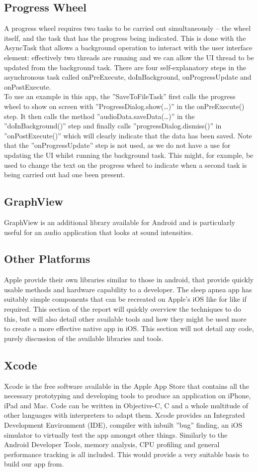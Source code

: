 \subsection{Progress Wheel}
A progress wheel requires two tasks to be carried out simultaneously – the wheel itself, and the task that has the progress being indicated. This is done with the AsyncTask that allows a background operation to interact with the user interface element: effectively two threads are running and we can allow the UI thread to be updated from the background task. There are four self-explanatory steps in the asynchronous task called onPreExecute, doInBackground, onProgressUpdate and onPostExecute.
\\ To use an example in this app, the ''SaveToFileTask'' first calls the progress wheel to show on screen with ''ProgressDialog.show(…)'' in the onPreExecute() step. It then calls the method ''audioData.saveData(…)'' in the ''doInBackground()'' step and finally calls ''progressDialog.dismiss()'' in ''onPostExecute()'' which will clearly indicate that the data has been saved. Note that the ''onProgressUpdate'' step is not used, as we do not have a use for updating the UI whilst running the background task. This might, for example, be used to change the text on the progress wheel to indicate when a second task is being carried out had one been present.
\subsection{GraphView}
GraphView is an additional library available for Android and is particularly useful for an audio application that looks at sound intensities. 
\subsection{Other Platforms}
Apple provide their own libraries similar to those in android, that provide quickly usable methods and hardware capability to a developer. The sleep apnea app has suitably simple components that can be recreated on Apple’s iOS like for like if required. This section of the report will quickly overview the techniques to do this, but will also detail other available tools and how they might be used more to create a more effective native app in iOS. This section will not detail any code, purely discussion of the available libraries and tools.
\subsection{Xcode}
Xcode is the free software available in the Apple App Store that contains all the necessary prototyping and developing tools to produce an application on iPhone, iPad and Mac. Code can be written in Objective-C, C and a whole multitude of other languages with interpreters to adapt them. Xcode provides an Integrated Development Environment (IDE), compiler with inbuilt ''bug'' finding, an iOS simulator to virtually test the app amongst other things. Similarly to the Android Developer Tools, memory analysis, CPU profiling and general performance tracking is all included. This would provide a very suitable basis to build our app from.
